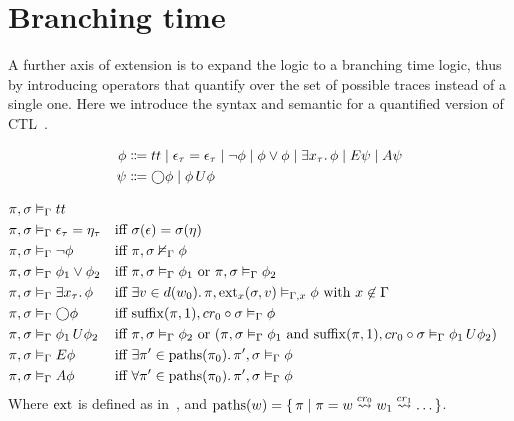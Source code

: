 \section{Branching time}
A further axis of extension is to expand the logic to a branching time logic, thus by introducing operators that
quantify over the set of possible traces instead of a single one. Here we introduce the syntax and semantic for a
quantified version of \ac{CTL}~\cite{hodkinson_decidable_2002}.

\begin{align*}
  \phi &\Coloneqq tt \;|\; \epsilon_\tau = \epsilon_\tau
                    \;|\; \neg\phi
                    \;|\; \phi \lor \phi
                    \;|\; \exists {x_\tau} \ldotp {\phi}
                    \;|\; E{\psi}
                    \;|\; A{\psi} \\
  \psi &\Coloneqq \bigcirc{\phi} \;|\; {\phi}\,U {\phi}
\end{align*}

\begin{align*}
  \pi, \sigma &\vDash_\Gamma tt \\
  \pi, \sigma &\vDash_\Gamma \epsilon_\tau = \eta_\tau &&\text{iff } \sigma(\epsilon) = \sigma(\eta) \\
  \pi, \sigma &\vDash_\Gamma \neg\phi &&\text{iff } {\pi}, {\sigma} \nvDash_{\Gamma} {\phi} \\
  \pi, \sigma &\vDash_\Gamma \phi_1 \lor \phi_2
      &&\text{iff } {\pi}, {\sigma} \vDash_{\Gamma} {\phi_1} \text{ or } {\pi}, {\sigma} \vDash_{\Gamma} {\phi_2} \\
  \pi, \sigma &\vDash_\Gamma \exists {x_\tau} \ldotp {\phi}
      &&\text{iff } \exists {v \in d(w_0)} \ldotp {{\pi}, {\operatorname{ext}_x(\sigma, v)} \vDash_{\Gamma, x} {\phi}}
        \text{ with } x \not\in \Gamma \\
  \pi, \sigma &\vDash_\Gamma \bigcirc{\phi}
      &&\text{iff } {\operatorname{suffix}(\pi, 1)}, {cr_0 \circ \sigma} \vDash_{\Gamma} {\phi} \\
  \pi, \sigma &\vDash_\Gamma {\phi_1}\,U {\phi_2}
      &&\text{iff } {\pi}, {\sigma} \vDash_{\Gamma} {\phi_2} \text{ or } ({\pi}, {\sigma} \vDash_{\Gamma} {\phi_1}
        \text { and } {\operatorname{suffix}(\pi, 1)}, {cr_0 \circ \sigma} \vDash_{\Gamma} {{\phi_1}\,U {\phi_2}}) \\
  \pi, \sigma &\vDash_\Gamma E{\phi}
      &&\text{iff } \exists {\pi' \in \operatorname{paths}(\pi_0)} \ldotp {{\pi'}, {\sigma} \vDash_{\Gamma} {\phi}} \\
  \pi, \sigma &\vDash_\Gamma A{\phi}
      &&\text{iff } \forall {\pi' \in \operatorname{paths}(\pi_0)} \ldotp {{\pi'}, {\sigma} \vDash_{\Gamma} {\phi}} \\
\end{align*}
Where $\operatorname{ext}$ is defined as in~, and $\operatorname{paths}(w) = \set{\pi | \pi = w \overset{cr_0}{\rightsquigarrow}
w_1 \overset{cr_1}{\rightsquigarrow} \ldots}$.

